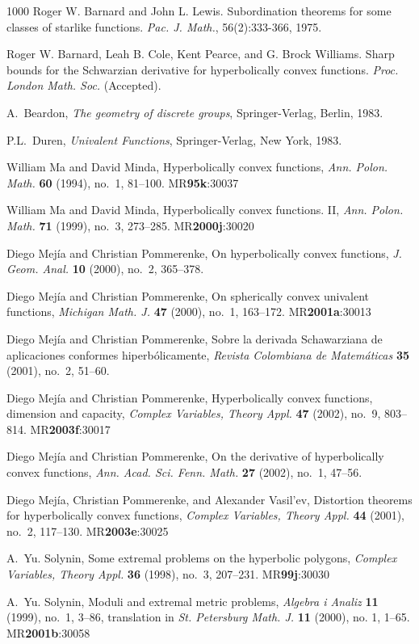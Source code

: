 \documentclass[final]{siamltex}
\begin{document}
\begin{thebibliography}{1000}
 Roger W. Barnard and John L. Lewis.  Subordination theorems for some classes of starlike functions.  \emph{Pac. J. Math.}, 56(2):333-366, 1975.

 Roger W. Barnard, Leah B. Cole, Kent Pearce, and G. Brock Williams.  Sharp bounds for the Schwarzian derivative for hyperbolically convex functions. \emph{Proc. London Math. Soc.} (Accepted).

 A.~Beardon, \emph{The geometry of discrete groups}, Springer-Verlag, Berlin, 1983.

 P.L.~Duren, \emph{Univalent Functions}, Springer-Verlag, New York, 1983.

William Ma and David Minda, Hyperbolically convex functions, \emph{Ann. Polon.
  Math.} \textbf{60} (1994), no.~1, 81--100. MR\textbf{95k}:30037

William Ma and David Minda, Hyperbolically convex functions. {II}, \emph{Ann. Polon. Math.}
  \textbf{71} (1999), no.~3, 273--285. MR\textbf{2000j}:30020

Diego Mej\'ia and Christian Pommerenke, On hyperbolically convex
  functions, \emph{J. Geom. Anal.} \textbf{10} (2000), no.~2, 365--378.

Diego Mej\'ia and Christian Pommerenke, On spherically convex univalent functions, \emph{Michigan Math. J.}
  \textbf{47} (2000), no.~1, 163--172. MR\textbf{2001a}:30013

Diego Mej\'ia and Christian Pommerenke, Sobre la derivada {Schawarziana} de aplicaciones conformes
  hiperb\'olicamente, \emph{Revista Colombiana de Matem\'aticas} \textbf{35} (2001),
  no.~2, 51--60.

Diego Mej\'ia and Christian Pommerenke, Hyperbolically convex functions, dimension and capacity,
  \emph{Complex Variables, Theory Appl.} \textbf{47} (2002), no.~9, 803--814.
  MR\textbf{2003f}:30017

Diego Mej\'ia and Christian Pommerenke, On the derivative of hyperbolically convex functions, \emph{Ann.
  Acad. Sci. Fenn. Math.} \textbf{27} (2002), no.~1, 47--56.

Diego Mej\'ia, Christian Pommerenke, and Alexander Vasil'ev,
  Distortion theorems for hyperbolically convex functions, \emph{Complex
  Variables, Theory Appl.} \textbf{44} (2001), no.~2, 117--130. MR\textbf{2003e}:30025

A.~Yu. Solynin, Some extremal problems on the hyperbolic polygons,
  \emph{Complex Variables, Theory Appl.} \textbf{36} (1998), no.~3, 207--231.
  MR\textbf{99j}:30030

A.~Yu. Solynin, Moduli and extremal metric problems, \emph{Algebra i Analiz}
  \textbf{11} (1999), no.~1, 3--86, translation in \emph{St. Petersburg Math. J.}
  \textbf{11} (2000), no. 1, 1--65. MR\textbf{2001b}:30058


\end{thebibliography}
\setcounter{equation}{0}
%
\end{document}

